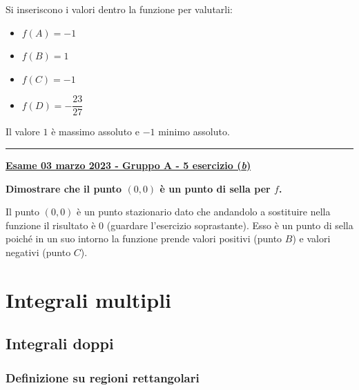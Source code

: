 \documentclass[a4paper]{article}
\newcommand{\longline}{\noindent\rule{\textwidth}{0.4pt}}
\newcommand{\definition}[1]{\textcolor{Red3}{\textbf{#1}}}
\newcommand{\example}[1]{\textcolor{Green4}{\textbf{#1}}}
\begin{document}
	Si inseriscono i valori dentro la funzione per valutarli:
	\begin{multicols}{3}
		\begin{itemize}
			\item $f\left(A\right) = -1$
			\item $f\left(B\right) = 1$
			\item $f\left(C\right) = -1$
			\item $f\left(D\right) = -\dfrac{23}{27}$
		\end{itemize}
	\end{multicols}
	Il valore $1$ è massimo assoluto e $-1$ minimo assoluto.

	\longline

	\begin{flushleft}
		\label{exam: esame 03 marzo 2023 - Gruppo A - 5 esercizio (b)}
		\hypertarget{
			exam: esame 03 marzo 2023 - Gruppo A - 5 esercizio (b)
		}{
			\definition{\underline{Esame 03 marzo 2023 - Gruppo A - 5 esercizio (\emph{b})}}
		}
	\end{flushleft}
	\example{Dimostrare che il punto $\left(0,0\right)$ è un punto di sella per $f$.}\newline

	\noindent
	Il punto $\left(0,0\right)$ è un punto stazionario dato che andandolo a sostituire nella funzione il risultato è $0$ (guardare l'esercizio soprastante). Esso è un punto di sella poiché in un suo intorno la funzione prende valori positivi (punto $B$) e valori negativi (punto $C$).


	

	\newpage

	\section{Integrali multipli}\label{section: integrali multipli}

	\subsection{Integrali doppi}\label{subsection: integrali doppi}

	\subsubsection{Definizione su regioni rettangolari}\label{subsubsection: definizione su regioni rettangolari}
\end{document}
